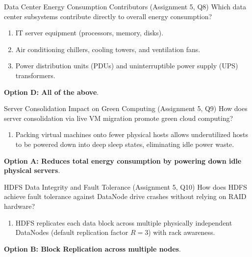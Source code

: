 \begin{solved}{Data Center Energy Consumption Contributors (Assignment 5, Q8)}
\Given Which data center subsystems contribute directly to overall energy consumption?
\Steps
\begin{enumerate}[leftmargin=*]
  \item IT server equipment (processors, memory, disks).
  \item Air conditioning chillers, cooling towers, and ventilation fans.
  \item Power distribution units (PDUs) and uninterruptible power supply (UPS) transformers.
\end{enumerate}
\Answer \textbf{Option D: All of the above}.
\end{solved}

\begin{solved}{Server Consolidation Impact on Green Computing (Assignment 5, Q9)}
\Given How does server consolidation via live VM migration promote green cloud computing?
\Steps
\begin{enumerate}[leftmargin=*]
  \item Packing virtual machines onto fewer physical hosts allows underutilized hosts to be powered down into deep sleep states, eliminating idle power waste.
\end{enumerate}
\Answer \textbf{Option A: Reduces total energy consumption by powering down idle physical servers}.
\end{solved}

\begin{solved}{HDFS Data Integrity and Fault Tolerance (Assignment 5, Q10)}
\Given How does HDFS achieve fault tolerance against DataNode drive crashes without relying on RAID hardware?
\Steps
\begin{enumerate}[leftmargin=*]
  \item HDFS replicates each data block across multiple physically independent DataNodes (default replication factor $R = 3$) with rack awareness.
\end{enumerate}
\Answer \textbf{Option B: Block Replication across multiple nodes}.
\end{solved}
